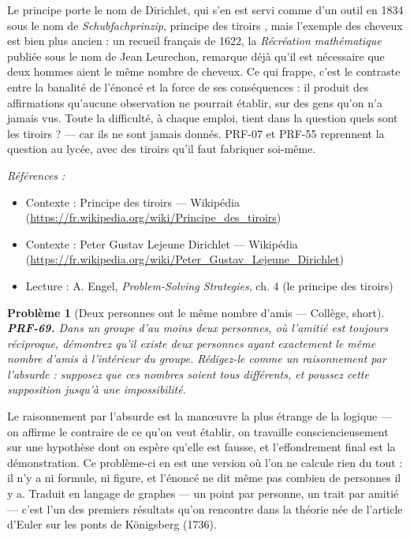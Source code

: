 \documentclass[11pt]{article}
\newtheorem{problem}{Problème}
\newenvironment{refs}{\par\small\noindent\emph{Références :}\begin{itemize}\setlength\itemsep{0pt}}{\end{itemize}\normalsize}
\begin{document}
\noindent Le principe porte le nom de Dirichlet, qui s'en est servi comme d'un outil
en 1834 sous le nom de \textit{Schubfachprinzip}, \og{} principe des tiroirs \fg{}, mais l'exemple des
cheveux est bien plus ancien : un recueil français de 1622, la \textit{Récréation
mathématique} publiée sous le nom de Jean Leurechon, remarque déjà qu'il est nécessaire
que deux hommes aient le même nombre de cheveux. Ce qui frappe, c'est le contraste entre la
banalité de l'énoncé et la force de ses conséquences : il produit des affirmations qu'aucune
observation ne pourrait établir, sur des gens qu'on n'a jamais vus. Toute la difficulté, à
chaque emploi, tient dans la question \og{} quels sont les tiroirs ? \fg{} --- car ils ne sont jamais
donnés. PRF-07 et PRF-55 reprennent la question au lycée, avec des tiroirs qu'il faut
fabriquer soi-même.

\begin{refs}
\item Contexte : Principe des tiroirs --- Wikipédia (\url{https://fr.wikipedia.org/wiki/Principe_des_tiroirs})
\item Contexte : Peter Gustav Lejeune Dirichlet --- Wikipédia (\url{https://fr.wikipedia.org/wiki/Peter_Gustav_Lejeune_Dirichlet})
\item Lecture : A. Engel, \textit{Problem-Solving Strategies}, ch. 4 (le principe des tiroirs)
\end{refs}

\bigskip

\begin{problem}[{Deux personnes ont le même nombre d'amis --- Collège, short}]
\textbf{PRF-69.} Dans un groupe d'au moins deux personnes, où l'amitié
est toujours réciproque, démontrez qu'il existe deux personnes ayant exactement le même
nombre d'amis à l'intérieur du groupe. Rédigez-le comme un raisonnement par l'absurde :
supposez que ces nombres soient tous différents, et poussez cette supposition jusqu'à une
impossibilité.
\end{problem}

\noindent Le raisonnement par l'absurde est la man\oe{}uvre la plus étrange de la
logique --- on affirme le contraire de ce qu'on veut établir, on travaille consciencieusement
sur une hypothèse dont on espère qu'elle est fausse, et l'effondrement final est la
démonstration. Ce problème-ci en est une version où l'on ne calcule rien du tout : il n'y a
ni formule, ni figure, et l'énoncé ne dit même pas combien de personnes il y a. Traduit en
langage de graphes --- un point par personne, un trait par amitié --- c'est l'un des premiers
résultats qu'on rencontre dans la théorie née de l'article d'Euler sur les ponts de
Königsberg (1736).
\end{document}
